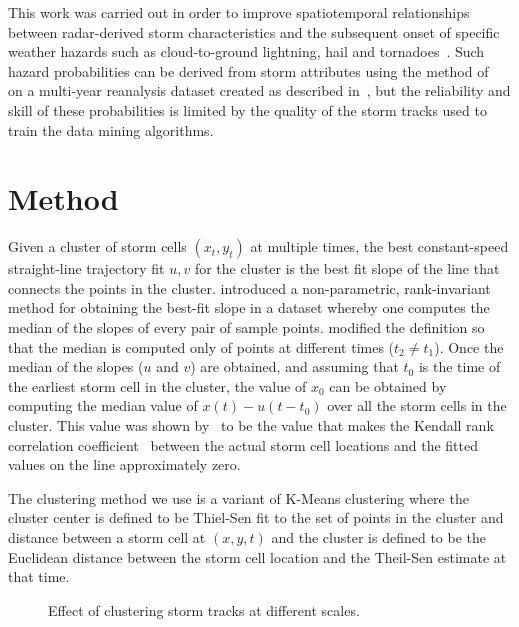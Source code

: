 \documentclass[11pt,twocolumn,twoside]{IEEEtran}
\begin{document}
This work was carried out in order to improve spatiotemporal relationships
between radar-derived storm characteristics and the subsequent onset of
specific weather hazards such as cloud-to-ground lightning, hail and
tornadoes~\cite{phi}.
Such hazard probabilities can be derived from storm attributes
using the method of~\cite{stormattr} on a multi-year reanalysis dataset created
as described in~\cite{hailclimo}, but the reliability and skill of
these probabilities is limited by the quality of the storm tracks used
to train the data mining algorithms.

\section{Method}
Given a cluster of storm cells $(x_t,y_t)$ at multiple times,
the best constant-speed straight-line trajectory fit $u,v$
for the cluster is the best fit slope of the line that connects the
points in the cluster.
\cite{theil} introduced a non-parametric, rank-invariant method for
obtaining the best-fit slope in a dataset whereby one computes
the median of the slopes of every pair of sample points.
\cite{sen} modified the definition so that the median is computed
only of points at different times ($t_2 \ne t_1$).
Once the median of the slopes ($u$ and $v$) are obtained, and
assuming that $t_0$ is the time of the earliest storm cell in the cluster,
the value of $x_0$ can be obtained by computing the median value of
$x(t) - u(t-t_0)$ over all the storm cells in the cluster.
This value was shown by~\cite{sen} to be the value that makes the
Kendall rank correlation coefficient~\cite{kendalltau} between
the actual storm cell locations and the fitted values on the line
approximately zero.

The clustering method we use is a variant of K-Means clustering where
the cluster center is defined to be Thiel-Sen fit to the set of points
in the cluster and distance between a storm cell at $(x,y,t)$
and the cluster is
defined to be the Euclidean distance between the storm cell location and the
Theil-Sen estimate at that time.

\begin{figure}
\begin{center}
\hsize {}
\end{center}
\caption{Effect of clustering storm tracks at different scales.}
\label{trackstats.fig}
\end{figure}
\end{document}
